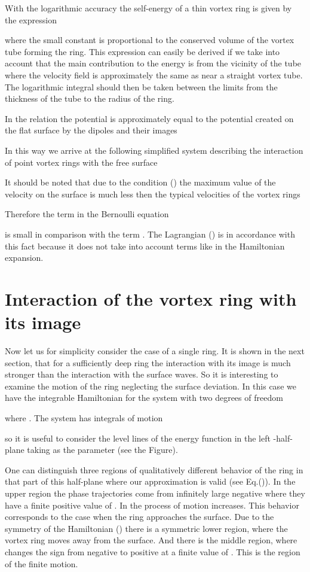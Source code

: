 With the logarithmic accuracy the self-energy of a thin vortex ring is given 
by the expression

where the small constant  is proportional to the conserved volume of 
the vortex tube forming the ring. This expression can easily be derived if we 
take into account that the main contribution to the energy is from the 
vicinity of the tube where the velocity field is approximately the same as near a 
straight vortex tube. The logarithmic integral  should then be taken between the 
limits from the thickness of the tube to the radius of the ring.

In the relation  the potential  is approximately equal 
to the potential created on the flat surface by the dipoles and their images


In this way we arrive at the following simplified system describing 
the interaction of point vortex rings with the free surface


It should be noted that due to the condition () the maximum
value of the velocity  on the surface is much less then the typical 
velocities of the vortex rings
 
Therefore the term  in the Bernoulli equation 

is small in comparison with the term . 
The Lagrangian () is in accordance with this fact because it does 
not take into account terms like 
 in the Hamiltonian expansion.

\section{Interaction of the vortex ring with its image}

Now let us for simplicity consider the case of a single ring.
It is shown in the next section, 
that for a sufficiently deep ring the interaction with its image 
is much stronger than the interaction with the surface waves.
So it is interesting to examine the motion of the 
ring neglecting the surface deviation. 
In this case we have the integrable Hamiltonian for the system 
with two degrees of freedom

where . The system has integrals of motion

so it is useful to consider the level lines of the energy function
in the left -half-plane taking  as the parameter 
(see the Figure).


One can distinguish three regions of qualitatively different behavior 
of the ring in that part of this half-plane where our approximation is valid
(see Eq.()). 
In the upper region the phase trajectories come from infinitely
large negative  where they have a finite positive value of . 
In the process of motion  increases.
This behavior corresponds to the case when the ring approaches the surface. 
Due to the symmetry of the Hamiltonian () there is
a symmetric lower region, where the vortex ring moves away from the surface.
And there is the middle region, where  changes the sign from negative to
positive at a finite value of . This is the region of the finite motion.

